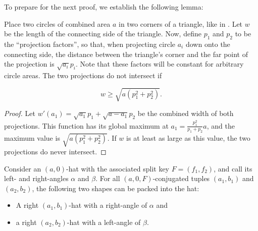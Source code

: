 \documentclass[a4paper,style=print,bibliography=totoc,nexus,lnum,extramargin]{tubsbook}
\begin{document}

To prepare for the next proof, we establish the following lemma:

\begin{lemma}\label{th:overlap}
    Place two circles of combined area $a$ in two corners of a triangle, like in . Let $w$ be the length of the connecting side of the triangle. Now, define $p_1$ and $p_2$ to be the “projection factors”, so that, when projecting circle $a_i$ down onto the connecting side, the distance between the triangle's corner and the far point of the projection is $\sqrt{a_i}p_i$. Note that these factors will be constant for arbitrary circle areas. The two projections do not intersect if

    $$w \ge \sqrt{a(p_1^2 + p_2^2)}.$$
\end{lemma}

\begin{proof}
    Let $w'(a_1) = \sqrt{a_1}p_1 + \sqrt{a-a_1}p_2$ be the combined width of both projections. This function has its global maximum at $a_1 = \frac{p_1^2}{p_1+p_2}a$, and the maximum value is $\sqrt{a(p_1^2+p_2^2)}$. If $w$ is at least as large as this value, the two projections do never intersect.
\end{proof}


\begin{lemma}\label{th:hats-in-hat}
    Consider an $(a,0)$-hat with the associated split key $F = (f_1, f_2)$, and call its left- and right-angles $\alpha$ and $\beta$.
    For all $(a,0,F)$-conjugated tuples $(a_1, b_1)$ and $(a_2, b_2)$, the following two shapes can be packed into the hat:
    \begin{itemize}
        \item A right $(a_1,b_1)$-hat with a right-angle of $\alpha$ and
        \item a right $(a_2,b_2)$-hat with a left-angle of $\beta$.
    \end{itemize}
\end{lemma}
\end{document}
